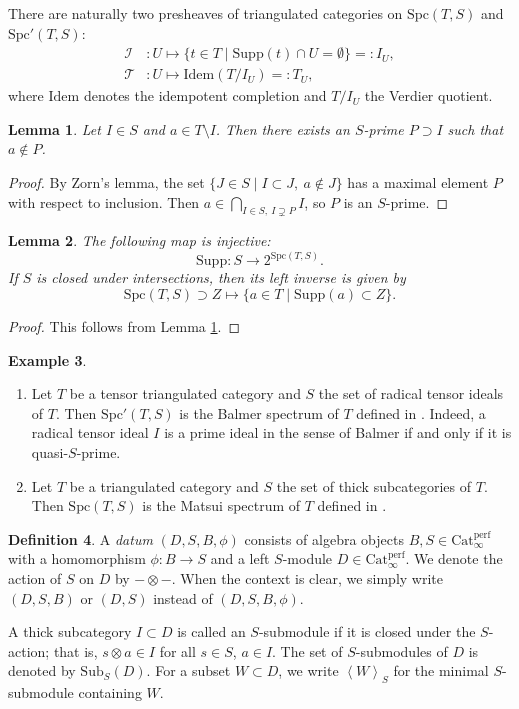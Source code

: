 \documentclass[11pt]{amsart}
\theoremstyle{definition}
\newtheorem{defn}{Definition}[section]
\newtheorem{example}[defn]{Example}
\theoremstyle{plain}
\newtheorem{lem}[defn]{Lemma}
\theoremstyle{remark}
\newcommand{\Idem}{\mathrm{Idem}}
\newcommand{\Sub}{\mathrm{Sub}}
\newcommand{\Supp}{\mathrm{Supp}}
\newcommand{\Perf}{\mathrm{Cat}_{\infty}^{\mathrm{perf}}}
\newcommand{\ang}[1]{{\left\langle{#1}\right\rangle}}
\newcommand{\Spc}{\mathrm{Spc}}
\numberwithin{equation}{section}
\begin{document}
There are naturally two presheaves of triangulated categories on \(\Spc(T,S)\) and \(\Spc'(T,S)\):
\begin{align*}
\mathcal{I}&: U \mapsto \{t\in T \mid \Supp(t)\cap U = \emptyset\} =: I_U,\\
\mathcal{T}&: U \mapsto \Idem(T/I_U) =: T_U,
\end{align*}
where \(\Idem\) denotes the idempotent completion and \(T/I_U\) the Verdier quotient.

\begin{lem}\label{lem:existance_of_prime}
Let \(I \in S\) and \(a \in T \setminus I\).
Then there exists an \(S\)-prime \(P \supset I\) such that \(a \notin P\).
\end{lem}
\begin{proof}
  By Zorn's lemma, the set \(\{J\in S \mid I\subset J,\ a\notin J\}\) has a maximal element \(P\) with respect to inclusion.
  Then \(a \in \bigcap_{I\in S,\ I\supsetneq P} I\), so \(P\) is an \(S\)-prime.
\end{proof}

\begin{lem}\label{lem:classification_of_submodules}
  The following map is injective:
  \[
  \Supp:S \longrightarrow 2^{\Spc(T,S)}.
  \]
  If \(S\) is closed under intersections, then its left inverse is given by 
  \[
\Spc(T,S)  \supset Z  \longmapsto \{a\in T \mid \Supp(a)\subset Z\}.
  \]
\end{lem}
\begin{proof}
This follows from Lemma \ref{lem:existance_of_prime}.
\end{proof}
\begin{example}
  \begin{enumerate}
    \item Let \(T\) be a tensor triangulated category and \(S\) the set of radical tensor ideals of \(T\).
    Then \(\Spc'(T,S)\) is the Balmer spectrum of \(T\) defined in \cite{Ba}.
    Indeed, a radical tensor ideal \(I\) is a prime ideal in the sense of Balmer if and only if it is quasi-\(S\)-prime.
    \item Let \(T\) be a triangulated category and \(S\) the set of thick subcategories of \(T\).
    Then \(\Spc(T,S)\) is the Matsui spectrum of \(T\) defined in \cite{Ma1}.
  \end{enumerate}
\end{example}

\begin{defn}
A \emph{datum} \((D,S,B,\phi)\) consists of algebra objects \(B,S \in \Perf\) with a homomorphism \(\phi:B \to S\) and a left \(S\)-module \(D \in \Perf\).
We denote the action of \(S\) on \(D\) by \(- \otimes -\).
When the context is clear, we simply write \((D,S,B)\) or \((D,S)\) instead of \((D,S,B,\phi)\).

A thick subcategory \(I \subset D\) is called an \(S\)-submodule if it is closed under the \(S\)-action; that is, \(s \otimes a \in I\) for all \(s \in S\), \(a \in I\).
The set of \(S\)-submodules of \(D\) is denoted by \(\Sub_S(D)\).
For a subset \(W \subset D\), we write \(\ang{W}_S\) for the minimal \(S\)-submodule containing \(W\).
\end{defn}
\end{document}
